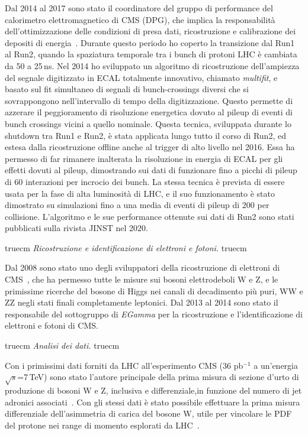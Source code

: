 \documentclass[11pt,twoside,a4paper]{article}
\begin{document}
Dal 2014 al 2017 sono stato il coordinatore del gruppo di performance
del calorimetro elettromagnetico di CMS (DPG), che implica la
responsabilit\`a dell'ottimizzazione delle condizioni di presa dati,
ricostruzione e calibrazione dei depositi di
energia~\cite{Khachatryan:2015iwa}. Durante questo periodo ho coperto
la transizione dal Run1 al Run2, quando la spaziatura temporale tra i
bunch di protoni LHC \`e cambiata da 50 a 25\,ns. Nel 2014 ho
sviluppato un algoritmo di ricostruzione dell'ampiezza del segnale
digitizzato in ECAL totalmente innovativo, chiamato \textit{multifit},
e basato sul fit simultaneo di segnali di bunch-crossings diversi che
si sovrappongono nell'intervallo di tempo della digitizzazione.
Questo permette di azzerare il peggioramento di risoluzione energetica
dovuto al pileup di eventi di bunch crossings vicini a quello
nominale.  Questa tecnica, sviluppata durante lo shutdown tra Run1 e
Run2, \`e stata applicata lungo tutto il corso di Run2, ed estesa
dalla ricostruzione offline anche al trigger di alto livello nel 2016.
Essa ha permesso di far rimanere inalterata la risoluzione in energia
di ECAL per gli effetti dovuti al pileup, dimostrando sui dati di
funzionare fino a picchi di pileup di 60 interazioni per incrocio dei
bunch. La stessa tecnica \`e prevista di essere usata per la fase di
alta luminosit\`a di LHC, e il suo funzionamento \`e stato dimostrato
su simulazioni fino a una media di eventi di pileup di 200 per
collisione. L'algoritmo e le sue performance ottenute sui dati di Run2
sono stati pubblicati sulla rivista JINST nel 2020.

 truecm
\textit{Ricostruzione e identificazione di elettroni e fotoni.}
 truecm

Dal 2008 sono stato uno degli sviluppatori della ricostruzione di
elettroni di CMS~\cite{Khachatryan:2015hwa}, che ha permesso tutte le
misure sui bosoni elettrodeboli W e Z, e le primissime ricerche del
bosone di Higgs nei canali di decadimento pi\`u puri, WW e ZZ negli
stati finali completamente leptonici. Dal 2013 al 2014 sono stato il
responsabile del sottogruppo di \textit{EGamma} per la ricostruzione e
l'identificazione di elettroni e fotoni di CMS.

 truecm
\textit{Analisi dei dati.}
 truecm

Con i primissimi dati forniti da LHC all'esperimento CMS (36 pb$^{-1}$
a un'energia $\sqrt{s}$=7\,TeV) sono stato l'autore principale della
prima misura di sezione d'urto di produzione di bosoni W e Z,
inclusiva e differenziale,in funzione del numero di jet adronici
associati~\cite{Chatrchyan:2011ne,Marco:2009dvd,Khachatryan:2010xn,CMS:2011aa}.
Con gli stessi dati \`e stato possibile effettuare la prima misura
differenziale dell'asimmetria di carica del bosone W, utile per
vincolare le PDF del protone nei range di momento esplorati da
LHC~\cite{Chatrchyan:2011jz}.
\end{document}
